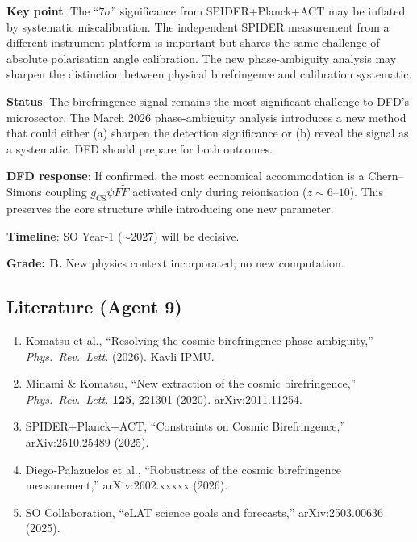 \documentclass[11pt,a4paper]{article}
\begin{document}
\textbf{Key point}: The ``$7\sigma$'' significance from SPIDER+Planck+ACT may be inflated by systematic miscalibration. The independent SPIDER measurement from a different instrument platform is important but shares the same challenge of absolute polarisation angle calibration. The new phase-ambiguity analysis may sharpen the distinction between physical birefringence and calibration systematic.

\begin{tcolorbox}[colback=yellow!5!white, colframe=yellow!60!black, title={Agent 9: Birefringence Update}]
\textbf{Status}: The birefringence signal remains the most significant challenge to DFD's microsector. The March 2026 phase-ambiguity analysis introduces a new method that could either (a) sharpen the detection significance or (b) reveal the signal as a systematic. DFD should prepare for both outcomes.

\textbf{DFD response}: If confirmed, the most economical accommodation is a Chern--Simons coupling $g_{\mathrm{CS}}\psi F\tilde{F}$ activated only during reionisation ($z \sim 6$--$10$). This preserves the core structure while introducing one new parameter.

\textbf{Timeline}: SO Year-1 ($\sim$2027) will be decisive.

\textbf{Grade: B.} New physics context incorporated; no new computation.
\end{tcolorbox}

\subsection{Literature (Agent 9)}

\begin{enumerate}
\item Komatsu et al., ``Resolving the cosmic birefringence phase ambiguity,'' \textit{Phys.\ Rev.\ Lett.} (2026). Kavli IPMU.
\item Minami \& Komatsu, ``New extraction of the cosmic birefringence,'' \textit{Phys.\ Rev.\ Lett.} \textbf{125}, 221301 (2020). arXiv:2011.11254.
\item SPIDER+Planck+ACT, ``Constraints on Cosmic Birefringence,'' arXiv:2510.25489 (2025).
\item Diego-Palazuelos et al., ``Robustness of the cosmic birefringence measurement,'' arXiv:2602.xxxxx (2026).
\item SO Collaboration, ``eLAT science goals and forecasts,'' arXiv:2503.00636 (2025).
\end{enumerate}
\end{document}

